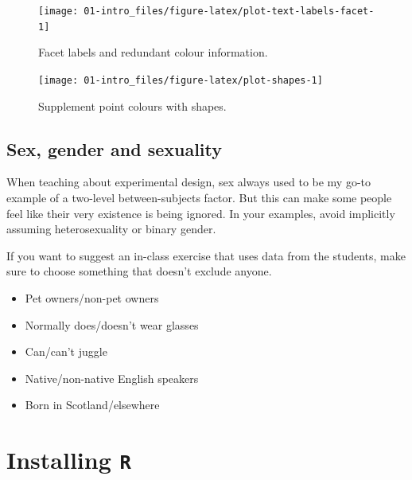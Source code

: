 \documentclass[
  oneside]{book}
\providecommand{\tightlist}{%
  \setlength{\itemsep}{0pt}\setlength{\parskip}{0pt}}
\begin{document}
\begin{figure}

{\centering \texttt{[image: 01-intro\_files/figure-latex/plot-text-labels-facet-1]} 

}

\caption{Facet labels and redundant colour information.}\label{fig:plot-text-labels-facet}
\end{figure}

\begin{figure}

{\centering \texttt{[image: 01-intro\_files/figure-latex/plot-shapes-1]} 

}

\caption{Supplement point colours with shapes.}\label{fig:plot-shapes}
\end{figure}

\hypertarget{sex-gender-and-sexuality}{%
\section{Sex, gender and sexuality}\label{sex-gender-and-sexuality}}

When teaching about experimental design, sex always used to be my go-to example of a two-level between-subjects factor. But this can make some people feel like their very existence is being ignored. In your examples, avoid implicitly assuming heterosexuality or binary gender.

If you want to suggest an in-class exercise that uses data from the students, make sure to choose something that doesn't exclude anyone.

\begin{itemize}
\tightlist
\item
  Pet owners/non-pet owners
\item
  Normally does/doesn't wear glasses
\item
  Can/can't juggle
\item
  Native/non-native English speakers
\item
  Born in Scotland/elsewhere
\end{itemize}

\hypertarget{appendix-appendices}{%
\appendix}


\hypertarget{installing-r}{%
\chapter{\texorpdfstring{Installing \texttt{R}}{Installing R}}\label{installing-r}}
\end{document}
